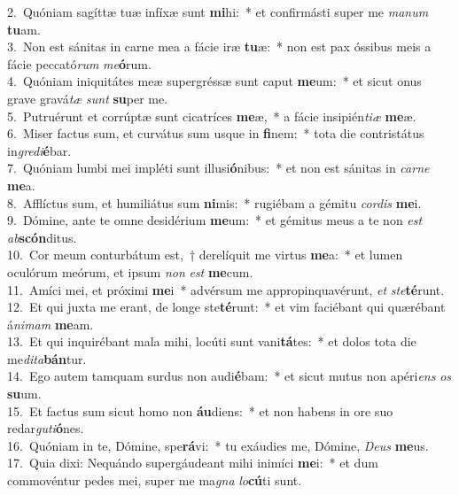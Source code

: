 {2.~}Quóniam sagíttæ tuæ infíxæ sunt \textbf{mi}hi:~* et confirmásti super me \textit{ma}\textit{num} \textbf{tu}am.\\
{3.~}Non est sánitas in carne mea a fácie iræ \textbf{tu}æ:~* non est pax óssibus meis a fácie peccató\textit{rum} \textit{me}\textbf{ó}rum.\\
{4.~}Quóniam iniquitátes meæ supergréssæ sunt caput \textbf{me}um:~* et sicut onus grave gravá\textit{tæ} \textit{sunt} \textbf{su}per me.\\
{5.~}Putruérunt et corrúptæ sunt cicatríces \textbf{me}æ,~* a fácie insipién\textit{ti}\textit{æ} \textbf{me}æ.\\
{6.~}Miser factus sum, et curvátus sum usque in \textbf{fi}nem:~* tota die contristátus in\textit{gre}\textit{di}\textbf{é}bar.\\
{7.~}Quóniam lumbi mei impléti sunt illusi\textbf{ó}nibus:~* et non est sánitas in \textit{car}\textit{ne} \textbf{me}a.\\
{8.~}Afflíctus sum, et humiliátus sum \textbf{ni}mis:~* rugiébam a gémitu \textit{cor}\textit{dis} \textbf{me}i.\\
{9.~}Dómine, ante te omne desidérium \textbf{me}um:~* et gémitus meus a te non \textit{est} \textit{ab}\textbf{scón}ditus.\\
{10.~}Cor meum conturbátum est,~† derelíquit me virtus \textbf{me}a:~* et lumen oculórum meórum, et ipsum \textit{non} \textit{est} \textbf{me}cum.\\
{11.~}Amíci mei, et próximi \textbf{me}i~* advérsum me appropinquavérunt, \textit{et} \textit{ste}\textbf{té}runt.\\
{12.~}Et qui juxta me erant, de longe ste\textbf{té}runt:~* et vim faciébant qui quærébant á\textit{ni}\textit{mam} \textbf{me}am.\\
{13.~}Et qui inquirébant mala mihi, locúti sunt vani\textbf{tá}tes:~* et dolos tota die me\textit{di}\textit{ta}\textbf{bán}tur.\\
{14.~}Ego autem tamquam surdus non audi\textbf{é}bam:~* et sicut mutus non apéri\textit{ens} \textit{os} \textbf{su}um.\\
{15.~}Et factus sum sicut homo non \textbf{áu}diens:~* et non habens in ore suo redar\textit{gu}\textit{ti}\textbf{ó}nes.\\
{16.~}Quóniam in te, Dómine, spe\textbf{rá}vi:~* tu exáudies me, Dómine, \textit{De}\textit{us} \textbf{me}us.\\
{17.~}Quia dixi: Nequándo supergáudeant mihi inimíci \textbf{me}i:~* et dum commovéntur pedes mei, super me ma\textit{gna} \textit{lo}\textbf{cú}ti sunt.\\

